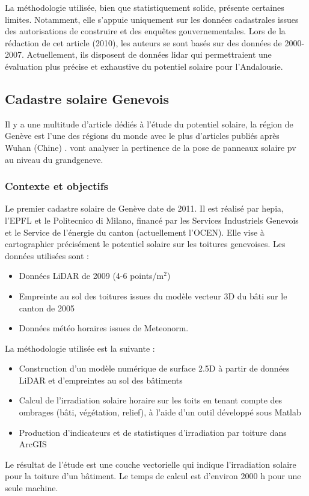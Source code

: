 \par{La méthodologie utilisée, bien que statistiquement solide, présente certaines limites. Notamment, elle s'appuie uniquement sur les données cadastrales issues des autorisations de construire et des enquêtes gouvernementales. Lors de la rédaction de cet article (2010), les auteurs se sont basés sur des données de 2000-2007. Actuellement, ils disposent de données \gls{lidar} \cite{nacional_plan_nodate} qui permettraient une évaluation plus précise et exhaustive du potentiel solaire pour l'Andalousie.}

\subsection{Cadastre solaire Genevois}

\par{Il y a une multitude d'article dédiés à l'étude du potentiel solaire, la région de Genève est l'une des régions du monde avec le plus d'articles publiés après Wuhan (Chine) \cite{drozd_evaluating_2025}. \citeauthor{thebault_large-scale_2022} \cite{thebault_large-scale_2022} vont analyser la pertinence de la pose de panneaux solaire \acrshort{pv} au niveau du \gls{grandgeneve}.}

\subsubsection{Contexte et objectifs}
\par{Le premier cadastre solaire de Genève \cite{desthieux_etude_2011} date de 2011. Il est réalisé par hepia, l'EPFL et le Politecnico di Milano, financé par les Services Industriels Genevois et le Service de l'énergie du canton (actuellement l'OCEN). Elle vise à cartographier précisément le potentiel solaire sur les toitures genevoises. Les données utilisées sont :}
\begin{itemize}
    \item Données LiDAR de 2009 (4-6 points/m$^2$)
    \item Empreinte au sol des toitures issues du modèle vecteur 3D du bâti sur le canton de 2005
    \item Données météo horaires issues de Meteonorm.
\end{itemize}
La méthodologie utilisée est la suivante :
\begin{itemize}
    \item Construction d'un modèle numérique de surface 2.5D à partir de données LiDAR et d'empreintes au sol des bâtiments
    \item Calcul de l'irradiation solaire horaire sur les toits en tenant compte des ombrages (bâti, végétation, relief), à l'aide d'un outil développé sous Matlab
    \item Production d'indicateurs et de statistiques d'irradiation par toiture dans ArcGIS
\end{itemize}
\par{Le résultat de l'étude est une couche vectorielle qui indique l'irradiation solaire pour la toiture d'un bâtiment. Le temps de calcul est d'environ 2000 h pour une seule machine.}

